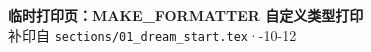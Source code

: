 \documentclass{article}
\begin{document}
	\begin{center}
		{\Large \textbf{临时打印页：MAKE\_FORMATTER 自定义类型打印}} \\[4pt]
		{\small 补印自 \texttt{sections/01\_dream\_start.tex}\quad·-10-12}
	\end{center}

	\vspace{0.5em}

	
\end{document}

